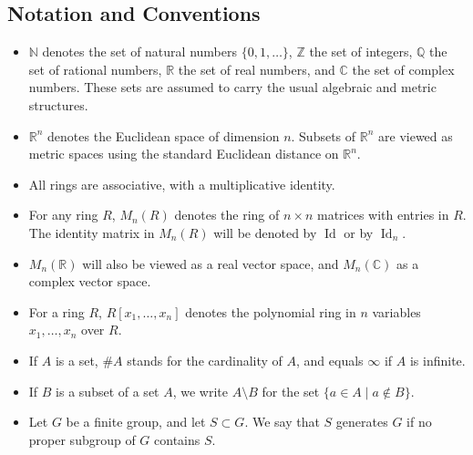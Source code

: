 \documentclass[11pt, a4paper]{article}
\begin{document}
\subsection*{Notation and Conventions}
\begin{itemize}
  \item $\mathbb{N}$ denotes the set of natural numbers $\{0, 1, \dots\}$, $\mathbb{Z}$ the set of integers, $\mathbb{Q}$ the set of rational numbers, $\mathbb{R}$ the set of real numbers, and $\mathbb{C}$ the set of complex numbers. These sets are assumed to carry the usual algebraic and metric structures.
  \item $\mathbb{R}^n$ denotes the Euclidean space of dimension $n$. Subsets of $\mathbb{R}^n$ are viewed as metric spaces using the standard Euclidean distance on $\mathbb{R}^n$.
  \item All rings are associative, with a multiplicative identity.
  \item For any ring $R$, $M_n(R)$ denotes the ring of $n \times n$ matrices with entries in $R$. The identity matrix in $M_n(R)$ will be denoted by $\operatorname{Id}$ or by $\operatorname{Id}_n$.
  \item $M_n(\mathbb{R})$ will also be viewed as a real vector space, and $M_n(\mathbb{C})$ as a complex vector space.
  \item For a ring $R$, $R[x_1, \dots, x_n]$ denotes the polynomial ring in $n$ variables $x_1, \dots, x_n$ over $R$.
  \item If $A$ is a set, $\#A$ stands for the cardinality of $A$, and equals $\infty$ if $A$ is infinite.
  \item If $B$ is a subset of a set $A$, we write $A \setminus B$ for the set $\{a \in A \mid a \notin B\}$.
  \item Let $G$ be a finite group, and let $S \subset G$. We say that $S$ generates $G$ if no proper subgroup of $G$ contains $S$.
\end{itemize}
\end{document}
